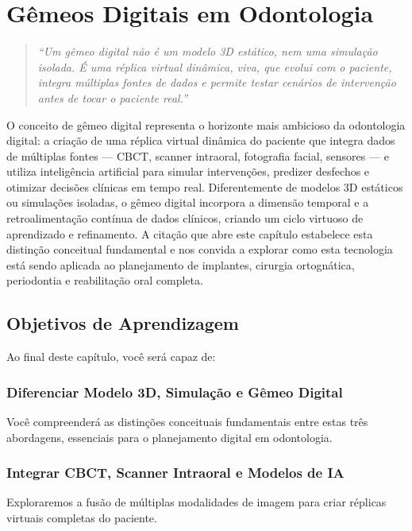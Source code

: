 \chapter{Gêmeos Digitais em Odontologia}
\label{cap:gemeos-digitais-odontologia}
\nivelquatro

\begin{quote}
\textit{``Um gêmeo digital não é um modelo 3D estático, nem uma simulação isolada. É uma réplica virtual dinâmica, viva, que evolui com o paciente, integra múltiplas fontes de dados e permite testar cenários de intervenção antes de tocar o paciente real.''}
\end{quote}

O conceito de gêmeo digital representa o horizonte mais ambicioso da odontologia digital: a criação de uma réplica virtual dinâmica do paciente que integra dados de múltiplas fontes --- CBCT, scanner intraoral, fotografia facial, sensores --- e utiliza inteligência artificial para simular intervenções, predizer desfechos e otimizar decisões clínicas em tempo real. Diferentemente de modelos 3D estáticos ou simulações isoladas, o gêmeo digital incorpora a dimensão temporal e a retroalimentação contínua de dados clínicos, criando um ciclo virtuoso de aprendizado e refinamento. A citação que abre este capítulo estabelece esta distinção conceitual fundamental e nos convida a explorar como esta tecnologia está sendo aplicada ao planejamento de implantes, cirurgia ortognática, periodontia e reabilitação oral completa.

\section{Objetivos de Aprendizagem}

Ao final deste capítulo, você será capaz de:

\subsection{Diferenciar Modelo 3D, Simulação e Gêmeo Digital}
Você compreenderá as distinções conceituais fundamentais entre estas três abordagens, essenciais para o planejamento digital em odontologia.

\subsection{Integrar CBCT, Scanner Intraoral e Modelos de IA}
Exploraremos a fusão de múltiplas modalidades de imagem para criar réplicas virtuais completas do paciente.

